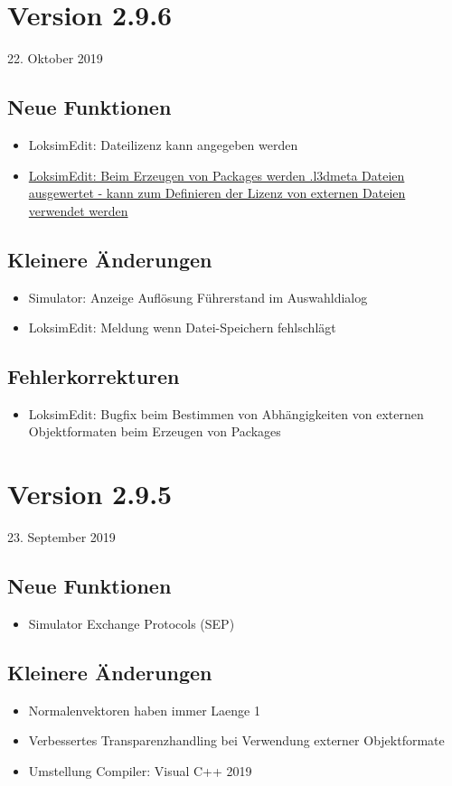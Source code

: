 \section{Version 2.9.6}\hfill 22. Oktober 2019
\subsection{Neue Funktionen}
\begin{itemize}
    \item LoksimEdit: Dateilizenz kann angegeben werden
    \item \hyperref[sec:editor.allg.packages.l3dmeta]{LoksimEdit: Beim Erzeugen von Packages werden .l3dmeta Dateien ausgewertet - kann zum Definieren der Lizenz von externen Dateien verwendet werden}
\end{itemize}

\subsection{Kleinere Änderungen}
\begin{itemize}
\item Simulator: Anzeige Auflösung Führerstand im Auswahldialog
\item LoksimEdit: Meldung wenn Datei-Speichern fehlschlägt
\end{itemize}

\subsection{Fehlerkorrekturen}
\begin{itemize}
\item LoksimEdit: Bugfix beim Bestimmen von Abhängigkeiten von externen Objektformaten beim Erzeugen von Packages
\end{itemize}


\section{Version 2.9.5}\hfill 23. September 2019
\subsection{Neue Funktionen}
\begin{itemize}
    \item Simulator Exchange Protocols (SEP)
\end{itemize}


\subsection{Kleinere Änderungen}
\begin{itemize}
\item Normalenvektoren haben immer Laenge 1
\item Verbessertes Transparenzhandling bei Verwendung externer Objektformate
\item Umstellung Compiler: Visual C++ 2019
\end{itemize}

